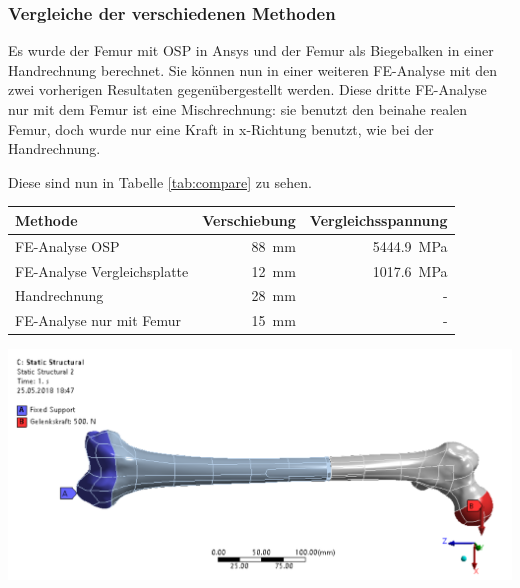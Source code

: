 	
		\subsubsection{Vergleiche der verschiedenen Methoden}
		
			Es wurde der Femur mit OSP in Ansys und der Femur als Biegebalken in einer Handrechnung berechnet.
			Sie können nun in einer weiteren FE-Analyse mit den zwei vorherigen Resultaten gegenübergestellt werden.
			Diese dritte FE-Analyse nur mit dem Femur ist eine Mischrechnung: sie benutzt den beinahe realen Femur,
			doch wurde nur eine Kraft in x-Richtung benutzt, wie bei der Handrechnung.
			
			Diese sind nun in Tabelle \ref{tab:compare} zu sehen.
		
			\begin{center}
				\renewcommand{\arraystretch}{1.5}
				\begin{tabular}{ | p{6cm} | r | r | }
					\multicolumn{1}{l}{\bfseries Methode} &
					\multicolumn{1}{l}{\bfseries Verschiebung} &
					\multicolumn{1}{l}{\bfseries Vergleichsspannung}\\ \hline
					
					FE-Analyse OSP              & \SI{88}{mm} & \SI{5444.9}{MPa} \\ \hline
					FE-Analyse Vergleichsplatte & \SI{12}{mm} & \SI{1017.6}{MPa} \\ \hline
					Handrechnung                & \SI{28}{mm} & - \\ \hline
					FE-Analyse nur mit Femur    & \SI{15}{mm} & - \\ \hline
				\end{tabular}
				\label{tab:compare}
			\end{center}
			
			
			\begin{Figure}
				\centering
				\includegraphics[width=15cm]{content/images/plausibility_forces.png}
				\label{fig:plausibility_forces}
			\end{Figure}
			
